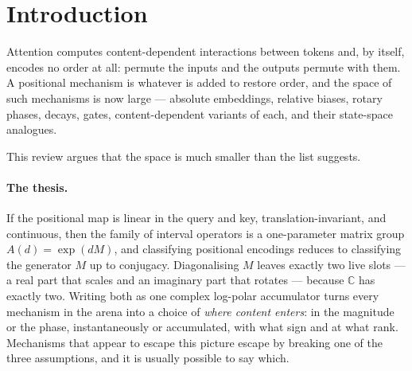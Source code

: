 \documentclass[11pt]{article}
\newcommand{\C}{\mathbb{C}}
\begin{document}
\begin{abstract}
\smallskip\noindent\emph{Corrected 2026-09-25.} Earlier versions said sign and rank are
varied deliberately by no one (the sign is settled in the state-tracking literature,
and MapFormer ablates $r\in\{1,2\}$), that they dominate the choice of encoding (under
a converged recipe the encoding effect is larger than rank's), that $r=2$ fails by a
badly conditioned basis (it is a search deficit: a rank-$2$ solution exists), and that
the ordering ``inverts'' on a clock task (the recency task does not need a clock, and
nothing inverts).

\smallskip\noindent\emph{Corrected 2026-09-27.} The 2026-09-25 text said which property of
the rank bottleneck is responsible was not separated. A separation batch
(\texttt{RANK\_SEP\_RESULTS.md}) since identified it as the per-head rank of the
content-to-phase map; cross-head sharing and $W_{\mathrm{out}}$'s per-entry scale are
individually unmeasured.

\smallskip\noindent\emph{Corrected 2026-09-30.} Earlier versions placed the navigation cost
of a monotone increment only past the training length. Trained and tested at $T=1024$ the
companion's matched-length control finds it in distribution ($-0.177$; the monotone arm
solves $0/8$ seeds against $8/8$; \texttt{SIGN\_MATCHED\_RESULTS.md}).
\end{abstract}

\section{Introduction}
\label{sec:intro}

Attention computes content-dependent interactions between tokens and, by itself,
encodes no order at all: permute the inputs and the outputs permute with them. A
positional mechanism is whatever is added to restore order, and the space of such
mechanisms is now large --- absolute embeddings, relative biases, rotary phases,
decays, gates, content-dependent variants of each, and their state-space analogues.

This review argues that the space is much smaller than the list suggests.

\paragraph{The thesis.} If the positional map is linear in the query and key,
translation-invariant, and continuous, then the family of interval operators is a
one-parameter matrix group $A(d) = \exp(dM)$, and classifying positional encodings
reduces to classifying the generator $M$ up to conjugacy. Diagonalising $M$ leaves
exactly two live slots --- a real part that scales and an imaginary part that
rotates --- because $\C$ has exactly two. Writing both as one complex log-polar
accumulator turns every mechanism in the arena into a choice of \emph{where content
enters}: in the magnitude or the phase, instantaneously or accumulated, with what
sign and at what rank. Mechanisms that appear to escape this picture escape by
breaking one of the three assumptions, and it is usually possible to say which.
\end{document}
